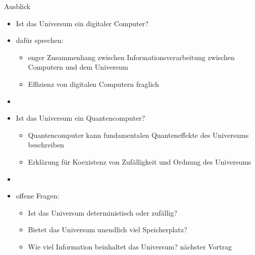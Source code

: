 \documentclass[aspectratio=1610, 9pt]{beamer}
\begin{document}
\begin{frame}{Ausblick}
  \begin{itemize}
    \item Ist das Universum ein digitaler Computer?
    \item dafür sprechen:
    \begin{itemize}
      \item enger Zusammenhang zwischen Informationsverarbeitung zwischen Computern und dem Universum
      \item Effizienz von digitalen Computern fraglich
    \end{itemize}
    \item[]
    \item Ist das Universum ein Quantencomputer?
    \begin{itemize}
      \item Quantencomputer kann fundamentalen Quanteneffekte des Universums beschreiben
      \item Erklärung für Koexistenz von Zufälligkeit und Ordnung des Universums
    \end{itemize}
    \item[]
    \item offene Fragen:
    \begin{itemize}
      \item Ist das Universum deterministisch oder zufällig?
      \item Bietet das Universum unendlich viel Speicherplatz?
      \item Wie viel Information beinhaltet das Universum? \rightarrow nächster Vortrag
    \end{itemize}
  \end{itemize}
\end{frame}
\end{document}
